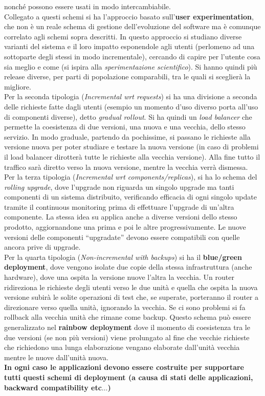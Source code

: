 \documentclass[a4paper,12pt, oneside]{book}
\begin{document}
nonché possono essere usati in modo intercambiabile.\\
Collegato a questi schemi si ha l'approccio basato sull'\textbf{user
  experimentation}, che non è un reale schema di gestione dell'evoluzione del
software ma è comunque correlato agli schemi sopra descritti. In questo
approccio si studiano diverse varianti del sistema e il loro impatto esponendole
agli utenti (perlomeno ad una sottoparte degli stessi in modo incrementale),
cercando di capire per l'utente cosa sia meglio e come (si ispira 
alla \textit{sperimentazione scientifico}). Si hanno quindi più release diverse,
per parti di popolazione comparabili, tra le quali si sceglierà la migliore.\\
Per la seconda tipologia (\textit{Incremental wrt requests}) si ha una divisione
a seconda delle richieste fatte dagli utenti (esempio un momento d'uso diverso
porta all'uso di componenti diverse), detto \textit{gradual rollout}. Si ha
quindi un \textit{load balancer} che 
permette la coesistenza di due versioni, una nuova e una vecchia, dello stesso
servizio. In modo graduale, partendo da pochissime, si passano le richieste alla
versione nuova per poter studiare e testare la nuova versione (in caso di
problemi il load balancer dirotterà tutte le richieste alla vecchia
versione). Alla fine tutto il traffico sarà diretto verso la nuova versione,
mentre la vecchia verrà dismessa.\\
Per la terza tipologia (\textit{Incremental wrt components/replicas}), si ha lo
schema del \textit{rolling upgrade}, dove l'upgrade non riguarda un singolo
upgrade ma tanti componenti di un sistema distribuito, verificando efficacia
di ogni singolo update tramite il continuous monitoring prima di effettuare
l'upgrade di un'altra componente. La stessa idea su applica anche a diverse
versioni dello stesso prodotto, aggiornandone una prima e poi le altre
progressivamente. Le nuove versioni delle componenti ``upgradate'' devono essere
compatibili con quelle ancora prive di upgrade.\\
Per la quarta tipologia (\textit{Non-incremental with backups}) si ha il
\textbf{blue/green deployment}, dove vengono isolate due copie della stessa
infrastruttura (anche hardware), dove una ospita la versione nuove l'altra la
vecchia. Un router ridireziona le richieste degli utenti verso le due unità e
quella che ospita la nuova 
versione subirà le solite operazioni di test che, se superate, porteranno il
router a direzionare verso quella unità, ignorando la vecchia. Se ci sono
problemi si fa rollback alla vecchia unità che rimane come backup. Questo schema
può essere generalizzato nel \textbf{rainbow deployment} dove il momento di
coesistenza tra le due versioni (se non più versioni) viene prolungato al fine
che vecchie richieste che richiedono una lunga elaborazione vengano elaborate
dall'unità vecchia mentre le nuove dall'unità nuova.\\
\textbf{In ogni caso le applicazioni devono essere costruite per supportare
  tutti questi schemi di deployment (a causa di stati delle applicazioni,
  backward compatibility etc$\ldots$)}
\end{document}
